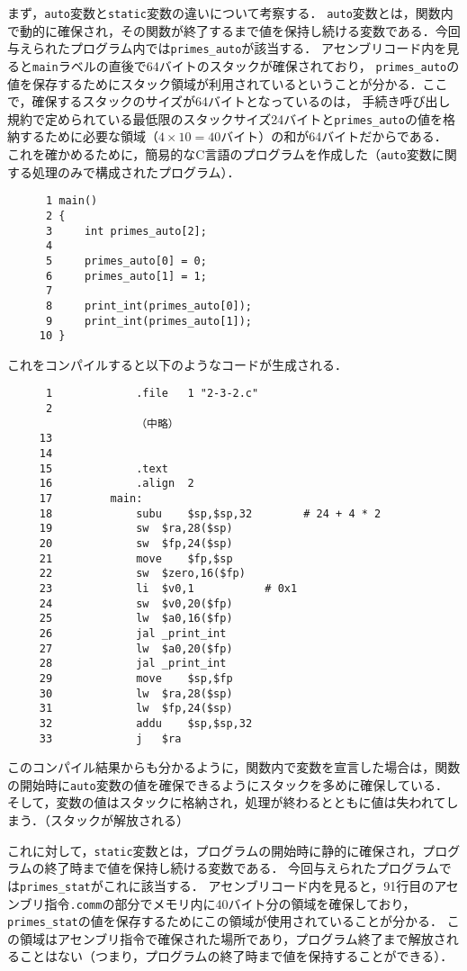 \documentclass[a4j,11pt]{jarticle}
\begin{document}
まず，{\tt auto}変数と{\tt static}変数の違いについて考察する．
{\tt auto}変数とは，関数内で動的に確保され，その関数が終了するまで値を保持し続ける変数である．今回与えられたプログラム内では{\tt primes\_auto}が該当する．
アセンブリコード内を見ると{\tt main}ラベルの直後で64バイトのスタックが確保されており，
{\tt primes\_auto}の値を保存するためにスタック領域が利用されているということが分かる．ここで，確保するスタックのサイズが64バイトとなっているのは，
手続き呼び出し規約で定められている最低限のスタックサイズ24バイトと{\tt primes\_auto}の値を格納するために必要な領域（$4 × 10 = 40$バイト）の和が64バイトだからである．
これを確かめるために，簡易的なC言語のプログラムを作成した（{\tt auto}変数に関する処理のみで構成されたプログラム）．

\begin{verbatim}
      1	main()
      2	{
      3	    int primes_auto[2];
      4	
      5	    primes_auto[0] = 0;
      6	    primes_auto[1] = 1;
      7	
      8	    print_int(primes_auto[0]);
      9	    print_int(primes_auto[1]);
     10	}
\end{verbatim}

これをコンパイルすると以下のようなコードが生成される．

\begin{verbatim}
      1    		    .file	1 "2-3-2.c"
      2    	
                    （中略）
     13    	
     14    	
     15    		    .text
     16    		    .align	2
     17    	    main:
     18    		    subu	$sp,$sp,32        # 24 + 4 * 2
     19    		    sw	$ra,28($sp)
     20    		    sw	$fp,24($sp)
     21    		    move	$fp,$sp
     22    		    sw	$zero,16($fp)
     23    		    li	$v0,1			# 0x1
     24    		    sw	$v0,20($fp)
     25    		    lw	$a0,16($fp)
     26    		    jal	_print_int
     27    		    lw	$a0,20($fp)
     28    		    jal	_print_int
     29    		    move	$sp,$fp
     30    		    lw	$ra,28($sp)
     31    		    lw	$fp,24($sp)
     32    		    addu	$sp,$sp,32
     33    		    j	$ra
\end{verbatim}

このコンパイル結果からも分かるように，関数内で変数を宣言した場合は，関数の開始時に{\tt auto}変数の値を確保できるようにスタックを多めに確保している．
そして，変数の値はスタックに格納され，処理が終わるとともに値は失われてしまう．（スタックが解放される）

これに対して，{\tt static}変数とは，プログラムの開始時に静的に確保され，プログラムの終了時まで値を保持し続ける変数である．
今回与えられたプログラムでは{\tt primes\_stat}がこれに該当する．
アセンブリコード内を見ると，91行目のアセンブリ指令{\tt .comm}の部分でメモリ内に40バイト分の領域を確保しており，
{\tt primes\_stat}の値を保存するためにこの領域が使用されていることが分かる．
この領域はアセンブリ指令で確保された場所であり，プログラム終了まで解放されることはない（つまり，プログラムの終了時まで値を保持することができる）．
\end{document}
